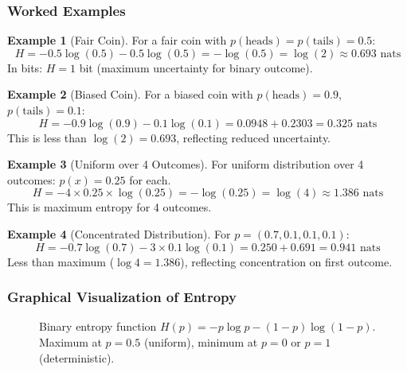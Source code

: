 \documentclass[11pt,a4paper]{article}
\theoremstyle{definition}
\newtheorem{example}{Example}[section]
\theoremstyle{plain}
\begin{document}
\subsubsection{Worked Examples}

\begin{example}[Fair Coin]
For a fair coin with $p(\text{heads}) = p(\text{tails}) = 0.5$:
\[
H = -0.5 \log(0.5) - 0.5 \log(0.5) = -\log(0.5) = \log(2) \approx 0.693 \text{ nats}
\]
In bits: $H = 1$ bit (maximum uncertainty for binary outcome).
\end{example}

\begin{example}[Biased Coin]
For a biased coin with $p(\text{heads}) = 0.9$, $p(\text{tails}) = 0.1$:
\[
H = -0.9 \log(0.9) - 0.1 \log(0.1) = 0.0948 + 0.2303 = 0.325 \text{ nats}
\]
This is less than $\log(2) = 0.693$, reflecting reduced uncertainty.
\end{example}

\begin{example}[Uniform over 4 Outcomes]
For uniform distribution over 4 outcomes: $p(x) = 0.25$ for each.
\[
H = -4 \times 0.25 \times \log(0.25) = -\log(0.25) = \log(4) \approx 1.386 \text{ nats}
\]
This is maximum entropy for 4 outcomes.
\end{example}

\begin{example}[Concentrated Distribution]
For $p = (0.7, 0.1, 0.1, 0.1)$:
\[
H = -0.7\log(0.7) - 3 \times 0.1\log(0.1) = 0.250 + 0.691 = 0.941 \text{ nats}
\]
Less than maximum ($\log 4 = 1.386$), reflecting concentration on first outcome.
\end{example}

\subsubsection{Graphical Visualization of Entropy}

\begin{figure}[h]
\centering
{}
\caption{Binary entropy function $H(p) = -p\log p - (1-p)\log(1-p)$. Maximum at $p=0.5$ (uniform), minimum at $p=0$ or $p=1$ (deterministic).}
\end{figure}
\end{document}
